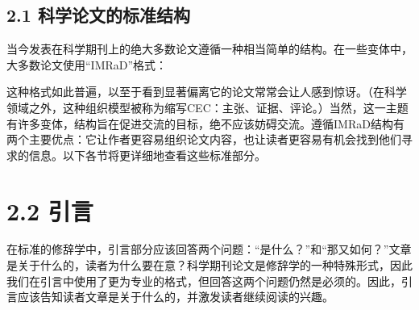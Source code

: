 \subsection*{2.1 科学论文的标准结构}
当今发表在科学期刊上的绝大多数论文遵循一种相当简单的结构。在一些变体中，大多数论文使用“IMRaD”格式：

这种格式如此普遍，以至于看到显著偏离它的论文常常会让人感到惊讶。（在科学领域之外，这种组织模型被称为缩写CEC：主张、证据、评论。）当然，这一主题有许多变体，结构旨在促进交流的目标，绝不应该妨碍交流。遵循IMRaD结构有两个主要优点：它让作者更容易组织论文内容，也让读者更容易有机会找到他们寻求的信息。以下各节将更详细地查看这些标准部分。

\section*{2.2 引言}
在标准的修辞学中，引言部分应该回答两个问题：“是什么？”和“那又如何？”文章是关于什么的，读者为什么要在意？科学期刊论文是修辞学的一种特殊形式，因此我们在引言中使用了更为专业的格式，但回答这两个问题仍然是必须的。因此，引言应该告知读者文章是关于什么的，并激发读者继续阅读的兴趣。

